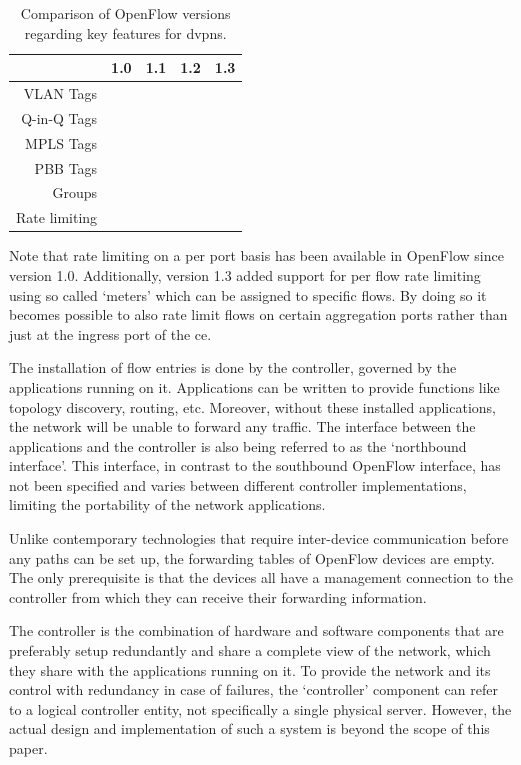 \begin{table}[!h]
	\centering
	\begin{tabular}{r|cccc}
	 			& 1.0 & 1.1 & 1.2 & 1.3 \\
	\hline
	VLAN Tags 	& \checkmark & \checkmark & \checkmark & \checkmark \\
	Q-in-Q Tags &   & \checkmark & \checkmark & \checkmark \\
	MPLS Tags 	&   & \checkmark & \checkmark & \checkmark \\
	PBB Tags 	&   &   &   & \checkmark \\
	Groups 		&   & \checkmark & \checkmark & \checkmark \\
	Rate limiting & \checkmark & \checkmark & \checkmark & \checkmark  \\
	\end{tabular}
	\caption{Comparison of OpenFlow versions regarding key features for \acp{dvpn}.}
	\label{tb:of-versions}	
\end{table}

Note that rate limiting on a per port basis has been available in OpenFlow since version 1.0. Additionally, version 1.3 added support for per flow rate limiting using so called `meters' which can be assigned to specific flows. By doing so it becomes possible to also rate limit flows on certain aggregation ports rather than just at the ingress port of the \ac{ce}.

The installation of flow entries is done by the controller, governed by the applications running on it. Applications can be written to provide functions like topology discovery, routing, etc. Moreover, without these installed applications, the network will be unable to forward any traffic. The interface between the applications and the controller is also being referred to as the `northbound interface'. This interface, in contrast to the southbound OpenFlow interface, has not been specified and varies between different controller implementations, limiting the portability of the network applications.

Unlike contemporary technologies that require inter-device communication before any paths can be set up, the forwarding tables of OpenFlow devices are empty. The only prerequisite is that the devices all have a management connection to the controller from which they can receive their forwarding information.

The controller is the combination of hardware and software components that are preferably setup redundantly and share a complete view of the network, which they share with the applications running on it. To provide the network and its control with redundancy in case of failures, the `controller' component can refer to a logical controller entity, not specifically a single physical server. However, the actual design and implementation of such a system is beyond the scope of this paper.

